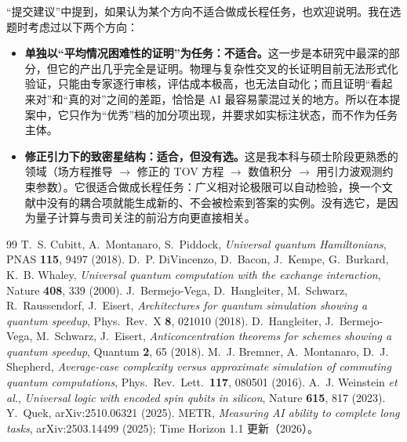 \documentclass[11pt,a4paper,fontset=none]{ctexart}
\begin{document}
“提交建议”中提到，如果认为某个方向不适合做成长程任务，也欢迎说明。我在选题时考虑过以下两个方向：

\begin{itemize}[itemsep=0.4em]
  \item \textbf{单独以“平均情况困难性的证明”为任务：不适合。}这一步是本研究中最深的部分，但它的产出几乎完全是证明。物理与复杂性交叉的长证明目前无法形式化验证，只能由专家逐行审核，评估成本极高，也无法自动化；而且证明“看起来对”和“真的对”之间的差距，恰恰是 AI 最容易蒙混过关的地方。所以在本提案中，它只作为“优秀”档的加分项出现，并要求如实标注状态，而不作为任务主体。
  \item \textbf{修正引力下的致密星结构：适合，但没有选。}这是我本科与硕士阶段更熟悉的领域（场方程推导 $\to$ 修正的 TOV 方程 $\to$ 数值积分 $\to$ 用引力波观测约束参数）。它很适合做成长程任务：广义相对论极限可以自动检验，换一个文献中没有的耦合项就能生成新的、不会被检索到答案的实例。没有选它，是因为量子计算与贵司关注的前沿方向更直接相关。
\end{itemize}

\begin{thebibliography}{99}\small
{} T.~S. Cubitt, A.~Montanaro, S.~Piddock, \emph{Universal quantum Hamiltonians}, PNAS \textbf{115}, 9497 (2018).
 D.~P. DiVincenzo, D.~Bacon, J.~Kempe, G.~Burkard, K.~B. Whaley, \emph{Universal quantum computation with the exchange interaction}, Nature \textbf{408}, 339 (2000).
 J.~Bermejo-Vega, D.~Hangleiter, M.~Schwarz, R.~Raussendorf, J.~Eisert, \emph{Architectures for quantum simulation showing a quantum speedup}, Phys.\ Rev.\ X \textbf{8}, 021010 (2018).
 D.~Hangleiter, J.~Bermejo-Vega, M.~Schwarz, J.~Eisert, \emph{Anticoncentration theorems for schemes showing a quantum speedup}, Quantum \textbf{2}, 65 (2018).
 M.~J. Bremner, A.~Montanaro, D.~J. Shepherd, \emph{Average-case complexity versus approximate simulation of commuting quantum computations}, Phys.\ Rev.\ Lett.\ \textbf{117}, 080501 (2016).
 A.~J. Weinstein \emph{et al.}, \emph{Universal logic with encoded spin qubits in silicon}, Nature \textbf{615}, 817 (2023).
 Y.~Quek, arXiv:2510.06321 (2025).
 METR, \emph{Measuring AI ability to complete long tasks}, arXiv:2503.14499 (2025); Time Horizon 1.1 更新（2026）。
\end{thebibliography}
\end{document}
